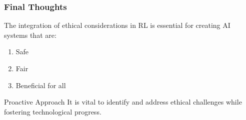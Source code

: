 \documentclass{beamer}
\begin{document}
\begin{frame}[fragile]
    \frametitle{Final Thoughts}
    The integration of ethical considerations in RL is essential for creating AI systems that are:
    \begin{enumerate}
        \item Safe
        \item Fair
        \item Beneficial for all
    \end{enumerate}
    
    \begin{block}{Proactive Approach}
        It is vital to identify and address ethical challenges while fostering technological progress.
    \end{block}
\end{frame}
\end{document}
